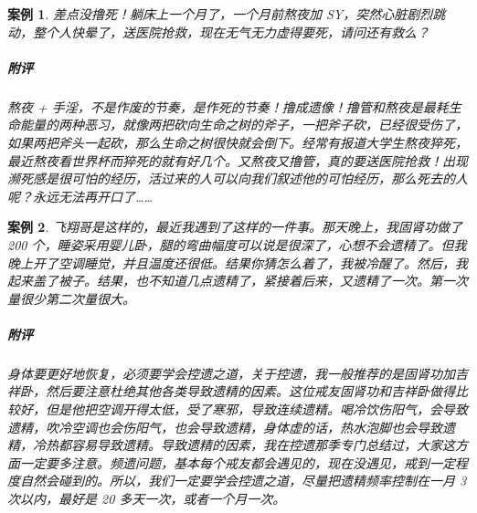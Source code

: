 \documentclass{ctexart}
\newtheorem{case}{案例}
\begin{document}
\begin{case}
    差点没撸死！躺床上一个月了，一个月前熬夜加 SY，突然心脏剧烈跳动，整个人快晕了，送医院抢救，现在无气无力虚得要死，请问还有救么？
    \subparagraph{附评} 熬夜 + 手淫，不是作废的节奏，是作死的节奏！撸成遗像！撸管和熬夜是最耗生命能量的两种恶习，就像两把砍向生命之树的斧子，一把斧子砍，已经很受伤了，如果两把斧头一起砍，那么生命之树很快就会倒下。经常有报道大学生熬夜猝死，最近熬夜看世界杯而猝死的就有好几个。又熬夜又撸管，真的要送医院抢救！出现濒死感是很可怕的经历，活过来的人可以向我们叙述他的可怕经历，那么死去的人呢？永远无法再开口了……
\end{case}

\begin{case}
    飞翔哥是这样的，最近我遇到了这样的一件事。那天晚上，我固肾功做了 200 个，睡姿采用婴儿卧，腿的弯曲幅度可以说是很深了，心想不会遗精了。但我晚上开了空调睡觉，并且温度还很低。结果你猜怎么着了，我被冷醒了。然后，我起来盖了被子。结果，也不知道几点遗精了，紧接着后来，又遗精了一次。第一次量很少第二次量很大。
    \subparagraph{附评} 身体要更好地恢复，必须要学会控遗之道，关于控遗，我一般推荐的是固肾功加吉祥卧，然后要注意杜绝其他各类导致遗精的因素。这位戒友固肾功和吉祥卧做得比较好，但是他把空调开得太低，受了寒邪，导致连续遗精。喝冷饮伤阳气，会导致遗精，吹冷空调也会伤阳气，也会导致遗精，身体虚的话，热水泡脚也会导致遗精，冷热都容易导致遗精。导致遗精的因素，我在控遗那季专门总结过，大家这方面一定要多注意。频遗问题，基本每个戒友都会遇见的，现在没遇见，戒到一定程度自然会碰到的。所以，我们一定要学会控遗之道，尽量把遗精频率控制在一月 3 次以内，最好是 20 多天一次，或者一个月一次。
\end{case}
\end{document}
